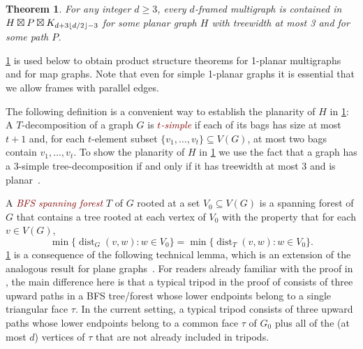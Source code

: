 \documentclass{patmorin}
\theoremstyle{plain}
\newtheorem{thm}{Theorem}
\theoremstyle{definition}
\newcommand{\defin}[1]{\textcolor{Maroon}{\emph{#1}}}
\DeclareMathOperator{\dist}{dist}
\DeclarePairedDelimiter{\floor}{\lfloor}{\rfloor}
\renewcommand{\ge}{\geqslant}
\begin{document}
\begin{thm}\label{d_framed_product_stucture}
For any integer $d\ge 3$, every $d$-framed multigraph is contained in $H\boxtimes P\boxtimes K_{d+3\floor{d/2}-3}$ for some planar graph $H$ with treewidth at most 3 and for some path $P$.
\end{thm}

\cref{d_framed_product_stucture} is used below to obtain product structure theorems for 1-planar multigraphs and for map graphs.  Note that even for simple 1-planar graphs it is essential that we allow frames with parallel edges.

The following definition is a convenient way to establish the planarity of $H$ in \cref{d_framed_product_stucture}:  A $T$-decomposition of a graph $G$ is \defin{$t$-simple} if each of its bags has size at most $t+1$ and, for each $t$-element subset $\{v_1,\ldots,v_t\}\subseteq V(G)$, at most two bags contain $v_1,\ldots,v_t$.  To show the planarity of $H$ in \cref{d_framed_product_stucture} we use the fact that a graph has a 3-simple tree-decomposition if and only if it has treewidth at most 3 and is planar~\citep{knauer.ueckerdt:simple,kratochvil.vaner:note}.


%
%
%
%
%
%
%
%

A \defin{BFS spanning forest} $T$ of $G$ rooted at a set $V_0\subseteq V(G)$ is a spanning forest of $G$ that contains a tree rooted at each vertex of $V_0$ with the property that for each $v\in V(G)$,
\[  \min\{\dist_G(v,w):w\in V_0\}=\min\{\dist_T(v,w):w\in V_0\}.  \]
\cref{d_framed_product_stucture} is a consequence of the following technical lemma, which is an extension of the analogous result for plane graphs~\cite[Lemma~17]{DJMMUW20}.  For readers already familiar with the proof in \cite{dujmovic.joret.ea:planar}, the main difference here is that a typical tripod in the proof of \cite[Lemma~17]{dujmovic.joret.ea:planar} consists of three upward paths in a BFS tree/forest whose lower endpoints belong to a single triangular face $\tau$.  In the current setting, a typical tripod consists of three upward paths whose lower endpoints belong to a common face $\tau$ of $G_0$ plus all of the (at most $d$) vertices of $\tau$ that are not already included in tripods.
\end{document}
